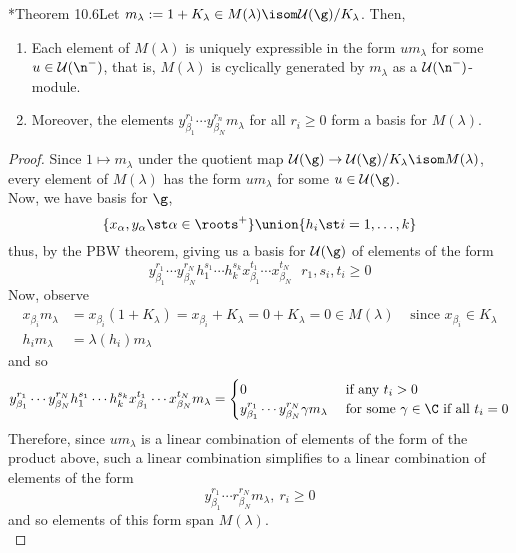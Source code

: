 \documentclass[11pt,leqno,oneside]{amsart}
\numberwithin{thm}{section}
\newcommand{\U}{\mathcal{U}}
\begin{document}
\begin{thm}
  \cite{carter}*{Theorem 10.6}Let \(m_\lambda := 1+ K_\lambda \in M(\lambda) \isom
  \U(\g)/K_\lambda\). Then,
  \begin{enumerate}
  \item Each element of \(M(\lambda)\) is uniquely expressible in the
    form \(um_\lambda\) for some \(u \in \U(\n^-)\), that is,
    \(M(\lambda)\) is cyclically generated by \(m_\lambda\) as a
    \(\U(\n^-)\)-module.
  \item Moreover, the elements \(y_{\beta_1}^{r_1} \cdots y_{\beta_N}^{r_n}
    m_\lambda\) for all \(r_i \geq 0\) form a basis for \(M(\lambda)\).
  \end{enumerate}
\end{thm}
\begin{proof}
  Since \(1 \mapsto m_\lambda\) under the quotient map \(\U(\g) \to
  \U(\g)/K_\lambda \isom M(\lambda)\), every element of \(M(\lambda)\)
  has the form \(um_\lambda\) for some \(u \in \U(\g)\).\\

  Now, we have basis for \(\g\), \[
    \{x_\alpha, y_\alpha \st \alpha \in \roots^+\} \union \{h_i \st i
    = 1,\ldots,k\}
  \]
  thus, by the PBW theorem, giving us a basis for \(\U(\g)\) of elements of the form \[
    y_{\beta_1}^{r_1} \cdots y_{\beta_N}^{r_N} h_1^{s_1} \cdots
    h_k^{s_k} x_{\beta_1}^{t_1} \cdots x_{\beta_N}^{t_N} \ \ \
    r_1, s_i, t_i \geq 0
  \]
  Now, observe
  \begin{align*}
    x_{\beta_i} m_\lambda
    & = x_{\beta_i}(1+K_\lambda) =
    x_{\beta_i}+K_\lambda = 0 + K_\lambda = 0 \in M(\lambda) 
    & \text{ since } x_{\beta_i} \in K_\lambda \\
    h_i m_\lambda & = \lambda(h_i) m_\lambda
  \end{align*}
  and so \[
    y_{\beta_1}^{r_1} \cdots y_{\beta_N}^{r_N} h_1^{s_1} \cdots
    h_k^{s_k} x_{\beta_1}^{t_1} \cdots x_{\beta_N}^{t_N} m_\lambda =
    \begin{cases}
      0 & \text{ if any }t_i > 0 \\
      y_{\beta_1}^{r_1} \cdots y_{\beta_N}^{r_N} \gamma m_\lambda
      & \text{ for some } \gamma \in \C \text{ if all }t_i = 0
    \end{cases}
  \]
  Therefore, since \(u m_\lambda\) is a linear combination of elements
  of the form of the product above, such a linear combination
  simplifies to a linear combination of elements of the form \[
    y_{\beta_1}^{r_1} \cdots r_{\beta_N}^{r_N} m_\lambda, \ r_i \geq 0
  \]
  and so elements of this form span \(M(\lambda)\). \\


\end{proof}
\end{document}
